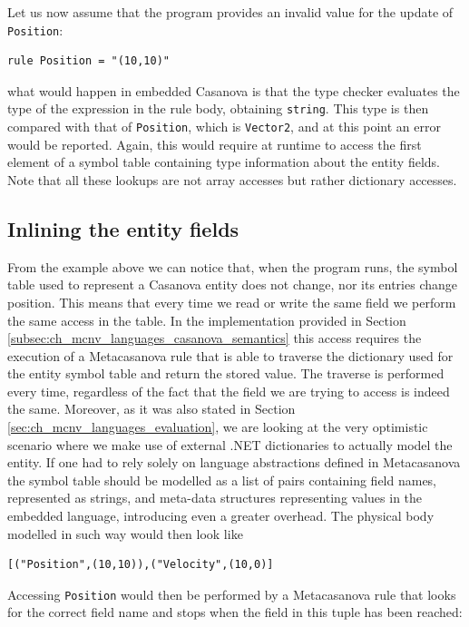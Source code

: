 Let us now assume that the program provides an invalid value for the update of \texttt{Position}:

\begin{lstlisting}
rule Position = "(10,10)"
\end{lstlisting}

\noindent
what would happen in embedded Casanova is that the type checker evaluates the type of the expression in the rule body, obtaining \texttt{string}. This type is then compared with that of \texttt{Position}, which is \texttt{Vector2}, and at this point an error would be reported. Again, this would require at runtime to access the first element of a symbol table containing type information about the entity fields. Note that all these lookups are not array accesses but rather dictionary accesses.

\subsection{Inlining the entity fields}
\label{subsec:ch_functors_inlining}
From the example above we can notice that, when the program runs, the symbol table used to represent a Casanova entity does not change, nor its entries change position. This means that every time we read or write the same field we perform the same access in the table. In the implementation provided in Section \ref{subsec:ch_mcnv_languages_casanova_semantics} this access requires the execution of a Metacasanova rule that is able to traverse the dictionary used for the entity symbol table and return the stored value. The traverse is performed every time, regardless of the fact that the field we are trying to access is indeed the same. Moreover, as it was also stated in Section \ref{sec:ch_mcnv_languages_evaluation}, we are looking at the very optimistic scenario where we make use of external .NET dictionaries to actually model the entity. If one had to rely solely on language abstractions defined in Metacasanova the symbol table should be modelled as a list of pairs containing field names, represented as strings, and meta-data structures representing values in the embedded language, introducing even a greater overhead. The physical body modelled in such way would then look like

\begin{lstlisting}
[("Position",(10,10)),("Velocity",(10,0)]
\end{lstlisting}

Accessing \texttt{Position} would then be performed by a Metacasanova rule that looks for the correct field name and stops when the field in this tuple has been reached:

